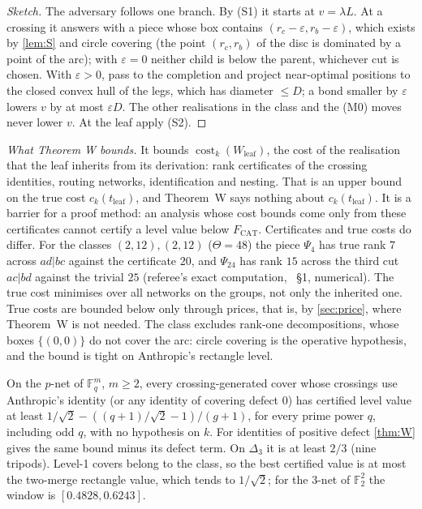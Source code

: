 \documentclass[10pt]{amsart}
\theoremstyle{plain}
\theoremstyle{definition}
\theoremstyle{remark}
\numberwithin{equation}{section}
\newcommand{\F}{\mathbb{F}}
\newcommand{\cost}{\operatorname{cost}}
\newcommand{\Fcat}{F_{\mathrm{CAT}}}
\newcommand{\eps}{\varepsilon}
\newcommand{\stR}{refereed by an AI referee only}
\newcommand{\stN}{numerical}
\begin{document}
\begin{proof}[Sketch]
The adversary follows one branch. By (S1) it starts at $v=\lambda L$. At a crossing it answers with a piece
whose box contains $(r_c-\eps,r_b-\eps)$, which exists by \cref{lem:S} and circle covering (the point $(r_c,r_b)$ of the disc is dominated by a point of the arc); with $\eps=0$
neither child is below the parent, whichever cut is chosen. With $\eps>0$, pass to the completion and
project near-optimal positions to the closed convex hull of the legs, which has diameter $\le D$; a bond
smaller by $\eps$ lowers $v$ by at most $\eps D$. The other realisations in the class and the (M0) moves
never lower $v$. At the leaf apply (S2).
\end{proof}

\emph{What Theorem W bounds.} It bounds $\cost_k(W_{\text{leaf}})$, the cost of the realisation that the leaf
inherits from its derivation: rank certificates of the crossing identities, routing networks,
identification and nesting. That is an upper bound on the true cost $c_k(t_{\text{leaf}})$, and Theorem~W says
nothing about $c_k(t_{\text{leaf}})$. It is a barrier for a proof method: an analysis whose cost bounds come only
from these certificates cannot certify a level value below $\Fcat$. Certificates and true costs do
differ. For the classes
$(2,12),(2,12)$ ($\Theta=48$) the piece $\Psi_4$ has true rank $7$ across $ad|bc$ against the certificate
$20$, and $\Psi_{24}$ has rank $15$ across the third cut $ac|bd$ against the trivial $25$ (referee's exact
computation, ~\S1, \stN). The true cost minimises over all networks on the groups, not
only the inherited one. True costs are bounded below only through prices, that is, by
\cref{sec:price}, where Theorem~W is not needed. The class excludes rank-one decompositions, whose boxes
$\{(0,0)\}$ do not cover the arc: circle covering is the operative hypothesis, and the bound is tight on
Anthropic's rectangle level.

\begin{corollary}[\stR; uses \cref{lem:zeroloss}]\label{cor:Wnets}
On the $p$-net of $\F_q^m$, $m\ge2$, every crossing-generated cover whose crossings use Anthropic's
identity (or any identity of covering defect $0$) has certified level value at least
$1/\sqrt2-((q+1)/\sqrt2-1)/(g+1)$, for every prime power $q$, including odd $q$, with no hypothesis on
$k$. For identities of positive defect \cref{thm:W} gives the same bound minus its defect term. On $\Delta_3$ it is at least $2/3$ (nine tripods). Level-1 covers belong to the class, so the best
certified value is at most the two-merge rectangle value, which tends to $1/\sqrt2$; for the 3-net of $\F_2^2$ the window
is $[0.4828,0.6243]$.
\end{corollary}
\end{document}
